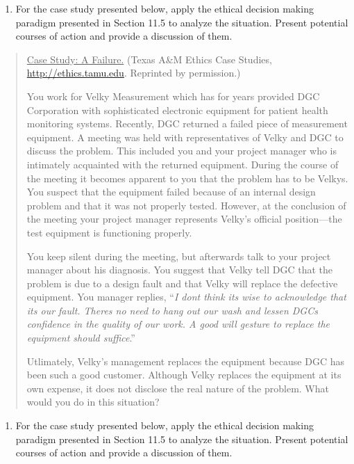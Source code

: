 \begin{enumerate}
\def\labelenumi{\arabic{enumi}.}
\setcounter{enumi}{10}
\item
  For the case study presented below, apply the ethical decision making
  paradigm presented in Section 11.5 to analyze the situation. Present
  potential courses of action and provide a discussion of them.
\end{enumerate}

\begin{quote}
\ul{Case Study: A Failure.} (Texas A\&M Ethics Case Studies,
\url{http://ethics.tamu.edu}. Reprinted by permission.)

You work for Velky Measurement which has for years provided DGC
Corporation with sophisticated electronic equipment for patient health
monitoring systems. Recently, DGC returned a failed piece of measurement
equipment. A meeting was held with representatives of Velky and DGC to
discuss the problem. This included you and your project manager who is
intimately acquainted with the returned equipment. During the course of
the meeting it becomes apparent to you that the problem has to be
Velky\textquotesingle s. You suspect that the equipment failed because
of an internal design problem and that it was not properly tested.
However, at the conclusion of the meeting your project manager
represents Velky's official position---the test equipment is functioning
properly.

You keep silent during the meeting, but afterwards talk to your project
manager about his diagnosis. You suggest that Velky tell DGC that the
problem is due to a design fault and that Velky will replace the
defective equipment. You manager replies, ``\emph{I
don\textquotesingle t think it\textquotesingle s wise to acknowledge
that it\textquotesingle s our fault. There\textquotesingle s no need to
hang out our wash and lessen DGC\textquotesingle s confidence in the
quality of our work. A good will gesture to replace the equipment should
suffice}.''

Utlimately, Velky's management replaces the equipment because DGC has
been such a good customer. Although Velky replaces the equipment at its
own expense, it does not disclose the real nature of the problem. What
would you do in this situation?
\end{quote}

\begin{enumerate}
\def\labelenumi{\arabic{enumi}.}
\setcounter{enumi}{11}
\item
  For the case study presented below, apply the ethical decision making
  paradigm presented in Section 11.5 to analyze the situation. Present
  potential courses of action and provide a discussion of them.
\end{enumerate}

